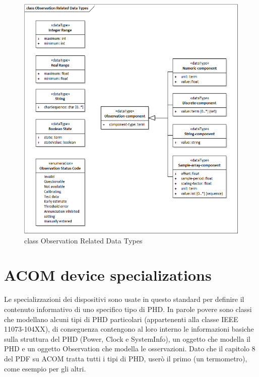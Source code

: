 \documentclass[a4paper]{article}
\begin{document}
        \begin{figure}[ht]
            \centering
            \includegraphics[width=1\textwidth]{figures/observation related data types class.png}
            \caption{class Observation Related Data Types}
            \label{fig:observationRelatedDataTypesClass}
        \end{figure}
        
    \section*{ACOM device specializations}
        Le specializzazioni dei dispositivi sono usate in questo standard per definire il contenuto informativo di uno specifico tipo di PHD.
        In parole povere sono classi che modellano alcuni tipi di PHD particolari (appartenenti alla classe IEEE 11073-104XX), di conseguenza contengono al loro interno le informazioni basiche sulla struttura del PHD (Power, Clock e SystemInfo), 
        un oggetto che modella il PHD e un oggetto Observation che modella le osservazioni. 
        Dato che il capitolo 8 del PDF su ACOM tratta tutti i tipi di PHD, userò il primo (un termometro), come esempio per gli altri.
        \newpage
\end{document}
